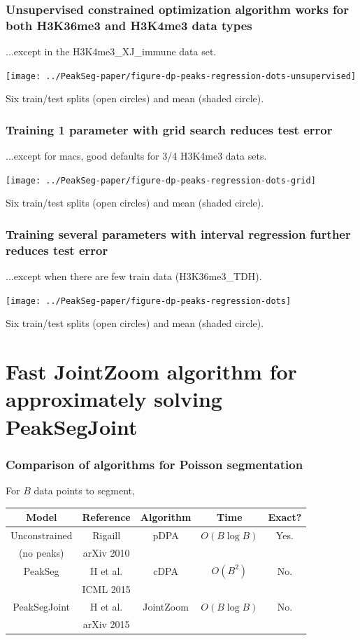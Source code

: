 \documentclass{beamer}
\begin{document}
\begin{frame}
  \frametitle{Unsupervised constrained optimization algorithm works
    for both H3K36me3 and H3K4me3 data types}

  ...except in the H3K4me3\_XJ\_immune data set.

  \texttt{[image: ../PeakSeg-paper/figure-dp-peaks-regression-dots-unsupervised]}
  
  Six train/test splits (open circles) and mean (shaded circle).
\end{frame}

\begin{frame}
  \frametitle{Training 1 parameter with grid search reduces test error}

  ...except for macs, good defaults for 3/4 H3K4me3 data sets.

  \texttt{[image: ../PeakSeg-paper/figure-dp-peaks-regression-dots-grid]}

  Six train/test splits (open circles) and mean (shaded circle).
\end{frame}

\begin{frame}
  \frametitle{Training several parameters with interval regression 
    further reduces test error}

  ...except when there are few train data (H3K36me3\_TDH).

  \texttt{[image: ../PeakSeg-paper/figure-dp-peaks-regression-dots]}

  Six train/test splits (open circles) and mean (shaded circle).
\end{frame}


\section*{Fast JointZoom algorithm for approximately solving
  PeakSegJoint}

\begin{frame}
  \frametitle{Comparison of algorithms for Poisson segmentation}

  For $B$ data points to segment,

  \vskip 1cm
  
  \begin{tabular}{ccccc}
    Model & Reference & Algorithm & Time & Exact?\\
    \hline
    Unconstrained & Rigaill  & pDPA & $O(B \log B)$ & Yes. \\
    (no peaks) & arXiv 2010\\
    \hline
    PeakSeg & H et al. & cDPA & $O(B^2)$ & No.\\
    & ICML 2015 \\
    \hline
    PeakSegJoint & H et al. & JointZoom & $O(B\log B)$ & No.\\
    & arXiv 2015
  \end{tabular}
  
\end{frame}
\end{document}
